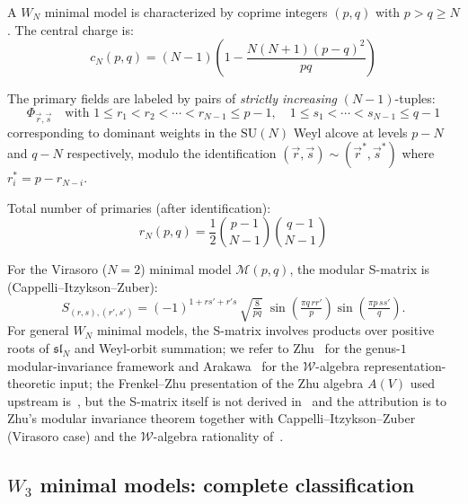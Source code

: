 \begin{definition}\label{def:wn-minimal}
A $W_N$ minimal model is characterized by coprime integers $(p,q)$ with $p > q \geq N$. The central charge is:
\begin{equation}
c_{N}(p,q) = (N-1)\left(1 - \frac{N(N+1)(p-q)^2}{pq}\right)
\end{equation}

The primary fields are labeled by pairs of \emph{strictly increasing} $(N{-}1)$-tuples:
\[\Phi_{\vec{r},\vec{s}} \quad \text{with } 1 \leq r_1 < r_2 < \cdots < r_{N-1} \leq p-1, \quad 1 \leq s_1 < \cdots < s_{N-1} \leq q-1\]
corresponding to dominant weights in the $\mathrm{SU}(N)$ Weyl alcove at levels $p-N$ and $q-N$ respectively, modulo the identification $(\vec{r},\vec{s}) \sim (\vec{r}^*, \vec{s}^*)$ where $r_i^* = p - r_{N-i}$.

Total number of primaries (after identification):
\[r_N(p,q) = \frac{1}{2}\binom{p-1}{N-1}\binom{q-1}{N-1}\]
\end{definition}

\begin{theorem}\label{thm:wn-s-matrix}
For the Virasoro ($N=2$) minimal model $\mathcal{M}(p,q)$, the modular
S-matrix is (Cappelli--Itzykson--Zuber):
\begin{equation}
S_{(r,s),(r',s')} = (-1)^{1+rs'+r's}\,\sqrt{\tfrac{8}{pq}}\;
\sin\!\left(\tfrac{\pi q\, r r'}{p}\right)
\sin\!\left(\tfrac{\pi p\, s s'}{q}\right).
\end{equation}
For general $W_N$ minimal models, the S-matrix involves products
over positive roots of $\mathfrak{sl}_N$ and Weyl-orbit summation;
we refer to Zhu~\cite{Zhu96} for the genus-$1$ modular-invariance
framework and Arakawa~\cite{Ara07} for the $\mathcal{W}$-algebra
representation-theoretic input; the Frenkel--Zhu presentation of the
Zhu algebra $A(V)$ used upstream is~\cite{FZ92}, but the S-matrix itself
is not derived in~\cite{FZ92} and the attribution is to Zhu's modular
invariance theorem together with Cappelli--Itzykson--Zuber (Virasoro
case) and the $\mathcal{W}$-algebra rationality of~\cite{Ara07}.
\end{theorem}

\subsection{\texorpdfstring{$W_3$ minimal models: complete classification}{W 3 minimal models: complete classification}}
\label{subsec:w3-minimal-complete}


